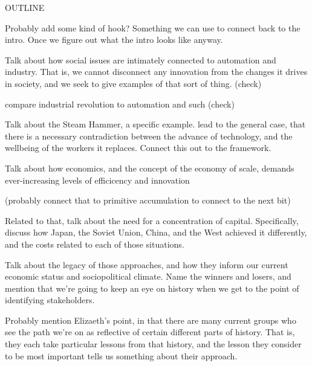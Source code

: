  

{\large OUTLINE}

Probably add some kind of hook?  Something we can use to connect 
back to the intro.  Once we figure out what the intro looks like 
anyway.

Talk about how social issues are intimately connected to automation 
and industry.  That is, we cannot disconnect any innovation from the 
changes it drives in society, and we seek to give examples of that sort 
of thing. (check)

compare industrial revolution to automation and such (check)

Talk about the Steam Hammer, a specific example.  lead to the general 
case, that there is a necessary contradiction between the advance of 
technology, and the wellbeing of the workers it replaces.  Connect 
this out to the framework.

Talk about how economics, and the concept of the economy of scale, 
demands ever-increasing levels of efficicency and innovation

(probably connect that to primitive accumulation to connect to the next bit)

Related to that, talk about the need for a concentration of capital.  
Specifically, discuss how Japan, the Soviet Union, China, and the 
West achieved it differently, and the costs related to each of those 
situations.

Talk about the legacy of those approaches, and how they inform our 
current economic status and sociopolitical climate.  Name the winners 
and losers, and mention that we're going to keep an eye on history when 
we get to the point of identifying stakeholders.  

Probably mention 
Elizaeth's point, in that there are many current groups who see the 
path we're on as reflective of certain different parts of history.  
That is, they each take particular lessons from that history, and 
the lesson they consider to be most important tells us something 
about their approach.




